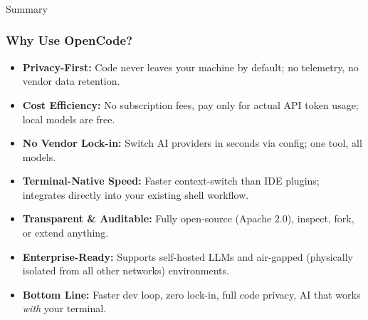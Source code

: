\begin{frame}[fragile]\frametitle{}

\begin{center}
{\Large Summary}
\end{center}
\end{frame}

\begin{frame}[fragile]\frametitle{Why Use OpenCode?}
  \begin{itemize}
    \item \textbf{Privacy-First:} Code never leaves your machine by default; no telemetry, no vendor data retention.
    \item \textbf{Cost Efficiency:} No subscription fees,  pay only for actual API token usage; local models are free.
    \item \textbf{No Vendor Lock-in:} Switch AI providers in seconds via config; one tool, all models.
    \item \textbf{Terminal-Native Speed:} Faster context-switch than IDE plugins; integrates directly into your existing shell workflow.
    \item \textbf{Transparent \& Auditable:} Fully open-source (Apache 2.0),  inspect, fork, or extend anything.
    \item \textbf{Enterprise-Ready:} Supports self-hosted LLMs and air-gapped (physically isolated from all other networks) environments.
    \item \textbf{Bottom Line:} Faster dev loop, zero lock-in, full code privacy,  AI that works \textit{with} your terminal.	
  \end{itemize}
\end{frame}

